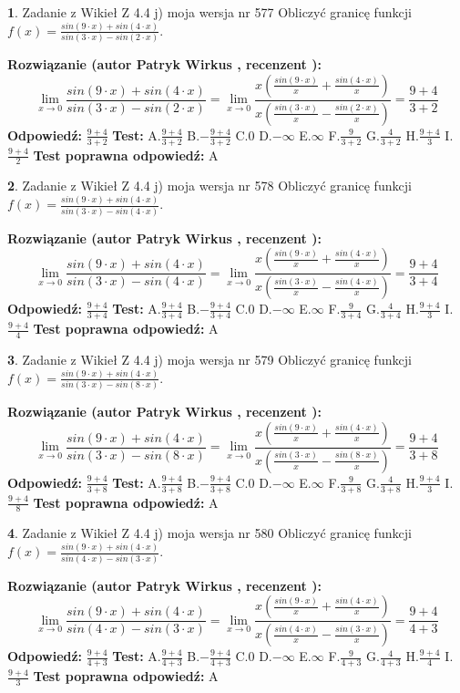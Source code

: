 \documentclass[12pt, a4paper]{article}
\theoremstyle{definition} %
\newtheorem{zad}{}
\newcommand{\zadStart}[1]{\begin{zad}#1\newline}
\newcommand{\zadStop}{\end{zad}}
\newcommand{\rozwStart}[2]{\noindent \textbf{Rozwiązanie (autor #1 , recenzent #2): }\newline}
\newcommand{\rozwStop}{\newline}
\newcommand{\odpStart}{\noindent \textbf{Odpowiedź:}\newline}
\newcommand{\odpStop}{\newline}
\newcommand{\testStart}{\noindent \textbf{Test:}\newline}
\newcommand{\testStop}{\newline}
\newcommand{\kluczStart}{\noindent \textbf{Test poprawna odpowiedź:}\newline}
\newcommand{\kluczStop}{\newline}
\begin{document}
\zadStart{Zadanie z Wikieł Z 4.4 j) moja wersja nr 577}
Obliczyć granicę funkcji $f(x)=\frac{sin(9\cdot x) +sin(4\cdot x)}{sin(3\cdot x) -sin(2\cdot x)}$.
\zadStop
\rozwStart{Patryk Wirkus}{}
$$\lim\limits_{x\to 0}\frac{sin(9\cdot x) +sin(4\cdot x)}{sin(3\cdot x) -sin(2\cdot x)}=\lim\limits_{x\to 0}\frac{x(\frac{sin(9\cdot x)}{x}+\frac{sin(4\cdot x)}{x})}{x(\frac{sin(3\cdot x)}{x}-\frac{sin(2\cdot x)}{x})}=\frac{9+4}{3+2}$$
\rozwStop
\odpStart
$\frac{9+4}{3+2}$
\odpStop
\testStart
A.$\frac{9+4}{3+2}$
B.$-\frac{9+4}{3+2}$
C.$0$
D.$-\infty$
E.$\infty$
F.$\frac{9}{3+2}$
G.$\frac{4}{3+2}$
H.$\frac{9+4}{3}$
I.$\frac{9+4}{2}$
\testStop
\kluczStart
A
\kluczStop



\zadStart{Zadanie z Wikieł Z 4.4 j) moja wersja nr 578}
Obliczyć granicę funkcji $f(x)=\frac{sin(9\cdot x) +sin(4\cdot x)}{sin(3\cdot x) -sin(4\cdot x)}$.
\zadStop
\rozwStart{Patryk Wirkus}{}
$$\lim\limits_{x\to 0}\frac{sin(9\cdot x) +sin(4\cdot x)}{sin(3\cdot x) -sin(4\cdot x)}=\lim\limits_{x\to 0}\frac{x(\frac{sin(9\cdot x)}{x}+\frac{sin(4\cdot x)}{x})}{x(\frac{sin(3\cdot x)}{x}-\frac{sin(4\cdot x)}{x})}=\frac{9+4}{3+4}$$
\rozwStop
\odpStart
$\frac{9+4}{3+4}$
\odpStop
\testStart
A.$\frac{9+4}{3+4}$
B.$-\frac{9+4}{3+4}$
C.$0$
D.$-\infty$
E.$\infty$
F.$\frac{9}{3+4}$
G.$\frac{4}{3+4}$
H.$\frac{9+4}{3}$
I.$\frac{9+4}{4}$
\testStop
\kluczStart
A
\kluczStop



\zadStart{Zadanie z Wikieł Z 4.4 j) moja wersja nr 579}
Obliczyć granicę funkcji $f(x)=\frac{sin(9\cdot x) +sin(4\cdot x)}{sin(3\cdot x) -sin(8\cdot x)}$.
\zadStop
\rozwStart{Patryk Wirkus}{}
$$\lim\limits_{x\to 0}\frac{sin(9\cdot x) +sin(4\cdot x)}{sin(3\cdot x) -sin(8\cdot x)}=\lim\limits_{x\to 0}\frac{x(\frac{sin(9\cdot x)}{x}+\frac{sin(4\cdot x)}{x})}{x(\frac{sin(3\cdot x)}{x}-\frac{sin(8\cdot x)}{x})}=\frac{9+4}{3+8}$$
\rozwStop
\odpStart
$\frac{9+4}{3+8}$
\odpStop
\testStart
A.$\frac{9+4}{3+8}$
B.$-\frac{9+4}{3+8}$
C.$0$
D.$-\infty$
E.$\infty$
F.$\frac{9}{3+8}$
G.$\frac{4}{3+8}$
H.$\frac{9+4}{3}$
I.$\frac{9+4}{8}$
\testStop
\kluczStart
A
\kluczStop



\zadStart{Zadanie z Wikieł Z 4.4 j) moja wersja nr 580}
Obliczyć granicę funkcji $f(x)=\frac{sin(9\cdot x) +sin(4\cdot x)}{sin(4\cdot x) -sin(3\cdot x)}$.
\zadStop
\rozwStart{Patryk Wirkus}{}
$$\lim\limits_{x\to 0}\frac{sin(9\cdot x) +sin(4\cdot x)}{sin(4\cdot x) -sin(3\cdot x)}=\lim\limits_{x\to 0}\frac{x(\frac{sin(9\cdot x)}{x}+\frac{sin(4\cdot x)}{x})}{x(\frac{sin(4\cdot x)}{x}-\frac{sin(3\cdot x)}{x})}=\frac{9+4}{4+3}$$
\rozwStop
\odpStart
$\frac{9+4}{4+3}$
\odpStop
\testStart
A.$\frac{9+4}{4+3}$
B.$-\frac{9+4}{4+3}$
C.$0$
D.$-\infty$
E.$\infty$
F.$\frac{9}{4+3}$
G.$\frac{4}{4+3}$
H.$\frac{9+4}{4}$
I.$\frac{9+4}{3}$
\testStop
\kluczStart
A
\kluczStop
\end{document}
